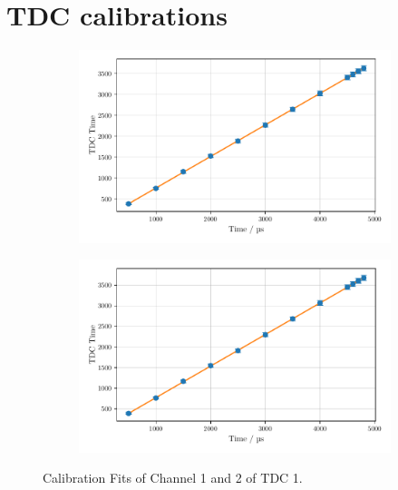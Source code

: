 \chapter{TDC calibrations}
\label{sec:tdc_figures}
\begin{figure}
    \centering
    \begin{subfigure}[b]{0.48\textwidth}
        \includegraphics[width=\textwidth]{plots/tdc0.pdf}
    \end{subfigure}\hfill
    \begin{subfigure}[b]{0.48\textwidth}
        \includegraphics[width=\textwidth]{plots/tdc1.pdf}
    \end{subfigure}
    \caption{Calibration Fits of Channel 1 and 2 of TDC 1.}
    \label{fig:tdc01}
\end{figure}

